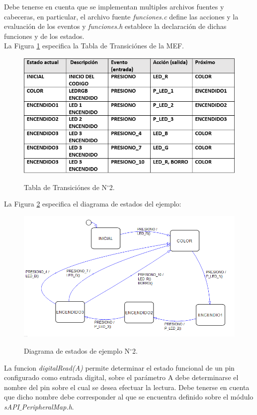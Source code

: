 \documentclass[12pt,letterpaper]{article}
\begin{document}
Debe tenerse en cuenta que se implementan multiples archivos fuentes y cabeceras, en particular, el archivo fuente \textit{funciones.c} define las acciones y la evaluación de los eventos y \textit{funciones.h} establece la declaración de dichas funciones y de los estados.
 \\
 
La Figura \ref{tablatransicionej2} especifica la Tabla de Transiciónes de la MEF.
\begin{figure}[H]
\centering
\includegraphics[width=10 cm]{figuras/f45.png}\\
\caption{Tabla de Transiciónes de N$^{\circ}$2.}
\label{tablatransicionej2}
\end{figure}
La Figura \ref{Fig22} especifica el diagrama de estados del ejemplo:

\begin{figure}[H]
\centering
\includegraphics[width=10 cm]{figuras/f4.png}\\
\caption{Diagrama de estados de ejemplo N$^{\circ}$2.}
\label{Fig22}
\end{figure}

La funcion \textit{digitalRead(A)} permite determinar el estado funcional de un pin configurado como entrada digital, sobre el parámetro A debe determinarse el nombre del pin sobre el cual se desea efectuar la lectura. Debe tenerse en cuenta que dicho nombre debe corresponder al que se encuentra definido sobre el módulo \textit{sAPI$\_$PeripheralMap.h}.
\end{document}

